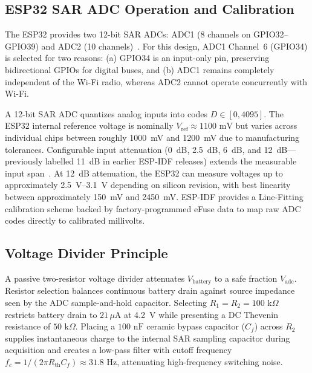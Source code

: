 \documentclass[12pt,a4paper]{article}
\begin{document}
\subsection{ESP32 SAR ADC Operation and Calibration}
The ESP32 provides two 12-bit SAR ADCs: ADC1 (8 channels on GPIO32--GPIO39) and ADC2 (10 channels)~\cite{espressif_esp32_trm}. For this design, ADC1 Channel~6 (GPIO34) is selected for two reasons: (a) GPIO34 is an input-only pin, preserving bidirectional GPIOs for digital buses, and (b) ADC1 remains completely independent of the Wi-Fi radio, whereas ADC2 cannot operate concurrently with Wi-Fi.

A 12-bit SAR ADC quantizes analog inputs into codes $D \in [0, 4095]$. The ESP32 internal reference voltage is nominally $V_{\text{ref}} \approx 1100\text{ mV}$ but varies across individual chips between roughly 1000~mV and 1200~mV due to manufacturing tolerances. Configurable input attenuation (0~dB, 2.5~dB, 6~dB, and 12~dB—previously labelled 11~dB in earlier ESP-IDF releases) extends the measurable input span~\cite{espressif_espidf}. At 12~dB attenuation, the ESP32 can measure voltages up to approximately 2.5~V--3.1~V depending on silicon revision, with best linearity between approximately 150~mV and 2450~mV. ESP-IDF provides a Line-Fitting calibration scheme backed by factory-programmed eFuse data to map raw ADC codes directly to calibrated millivolts.

\subsection{Voltage Divider Principle}
A passive two-resistor voltage divider attenuates $V_{\text{battery}}$ to a safe fraction $V_{\text{adc}}$. Resistor selection balances continuous battery drain against source impedance seen by the ADC sample-and-hold capacitor. Selecting $R_1 = R_2 = 100\text{ k}\Omega$ restricts battery drain to $21\,\mu\text{A}$ at 4.2~V while presenting a DC Thevenin resistance of $50\text{ k}\Omega$. Placing a $100\text{ nF}$ ceramic bypass capacitor ($C_f$) across $R_2$ supplies instantaneous charge to the internal SAR sampling capacitor during acquisition and creates a low-pass filter with cutoff frequency $f_c = 1 / (2\pi R_{\text{th}} C_f) \approx 31.8\text{ Hz}$, attenuating high-frequency switching noise.
\end{document}
